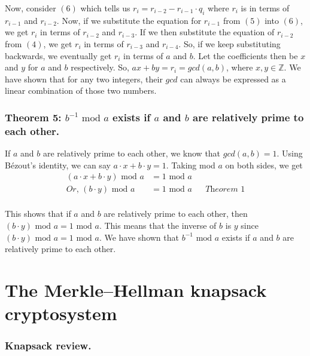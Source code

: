 \documentclass[manuscript,screen,review,nonacm]{acmart}
\begin{document}
{     Now, consider $(6)$ which tells us $r_{i}=r_{i-2} - r_{i-1}\cdot q_i$ where $r_i$ is in terms of $r_{i-1}$ and $r_{i-2}$. Now, if we substitute the equation for $r_{i-1}$ from $(5)$ into $(6)$, we get $r_i$ in terms of $r_{i-2}$ and $r_{i-3}$.
     If we then substitute the equation of $r_{i-2}$ from $(4)$, we get $r_i$ in terms of $r_{i-3}$ and $r_{i-4}$. So, if we keep substituting backwards, we eventually get $r_i$ in terms of $a$ and $b$. Let the coefficients then be $x$ and $y$ for $a$ and $b$ respectively. So, $ax + by = r_i = gcd(a,b)$, where $x,y \in \mathbb{Z}$. We have shown that for any two integers, their $gcd$ can always be expressed as a linear combination of those two numbers. 
    
\subsubsection*{Theorem 5:  $b^{-1} \text { mod } a$ exists if $a$ and $b$ are relatively prime to each other.\newline}
If $a$ and $b$ are relatively prime to each other, we know that $gcd(a,b) = 1$. Using Bézout's identity, we can say $a\cdot x + b\cdot y = 1$. Taking mod $a$ on both sides, we get 
\begin{align*}
    (a\cdot x + b\cdot y) \text { mod } a &= 1 \text{ mod }a \\
    \textit{Or, } (b\cdot y) \text { mod } a &= 1\text { mod } a && \textit{Theorem 1} \\
\end{align*}

     This shows that if $a$ and $b$ are relatively prime to each other, then $(b\cdot y)  \text { mod } a = 1  \text { mod } a$. This means that the inverse of $b$ is $y$ since $(b\cdot y) \text { mod } a = 1 \text { mod } a$.
     We have shown that $b^{-1}\text{ mod } a$ exists if $a$ and $b$ are relatively prime to each other.

\section{The Merkle–Hellman knapsack cryptosystem}
\subsubsection*{Knapsack review.\newline}

}
\end{document}
